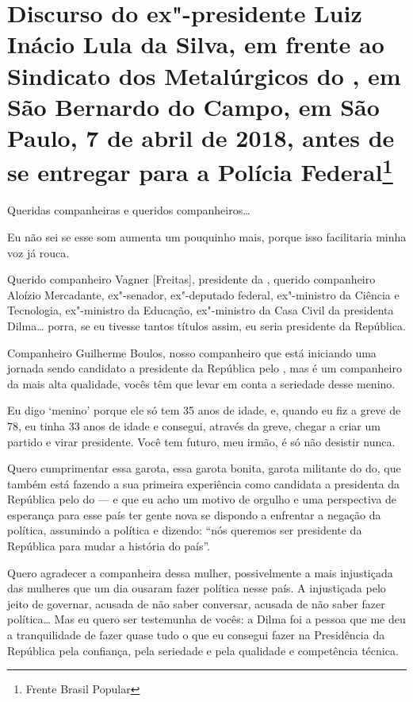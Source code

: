 \chapter*{Discurso do ex"-presidente Luiz Inácio Lula da Silva, em frente ao
Sindicato dos Metalúrgicos do , em São Bernardo do Campo, em São
Paulo, 7 de abril de 2018, antes de se entregar para a Polícia Federal\footnote{Frente Brasil Popular}}


Queridas companheiras e queridos companheiros\ldots{}

Eu não sei se esse som aumenta um pouquinho mais, porque isso
facilitaria minha voz já rouca.

Querido companheiro Vagner [Freitas], presidente da ,
querido companheiro Aloízio Mercadante, ex"-senador, ex"-deputado federal,
ex"-ministro da Ciência e Tecnologia, ex"-ministro da Educação,
ex"-ministro da Casa Civil da presidenta Dilma\ldots{} porra, se eu tivesse
tantos títulos assim, eu seria presidente da República.

Companheiro Guilherme Boulos, nosso companheiro que está iniciando
uma jornada sendo candidato a presidente da República pelo , mas é
um companheiro da mais alta qualidade, vocês têm que levar em conta
a seriedade desse menino.

Eu digo `menino' porque ele só tem 35 anos de idade, e, quando eu
fiz a greve de 78, eu tinha 33 anos de idade e consegui, através da
greve, chegar a criar um partido e virar presidente. Você tem futuro,
meu irmão, é só não desistir nunca.

Quero cumprimentar essa garota, essa garota bonita, garota
militante do do, que também está fazendo a sua primeira experiência
como candidata a presidenta da República pelo do --- e que eu acho
um motivo de orgulho e uma perspectiva de esperança para esse país ter
gente nova se dispondo a enfrentar a negação da política, assumindo a
política e dizendo: ``nós queremos ser presidente da República para mudar
a história do país''.

Quero agradecer a companheira dessa mulher, possivelmente a mais
injustiçada das mulheres que um dia ousaram fazer política nesse país. A
injustiçada pelo jeito de governar, acusada de não saber conversar,
acusada de não saber fazer política\ldots{} Mas eu quero ser testemunha de
vocês: a Dilma foi a pessoa que me deu a tranquilidade de fazer quase
tudo o que eu consegui fazer na Presidência da República pela confiança,
pela seriedade e pela qualidade e competência técnica.

